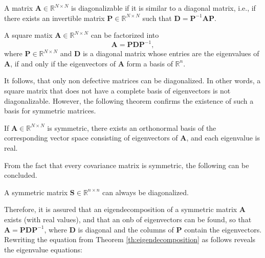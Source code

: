 \documentclass[../../../main.tex]{subfiles}
\begin{document}
\begin{theorem} \cite[p.98]{dei_2020}
A matrix $\bm{A} \in \mathbb{R}^{N \times N}$ is diagonalizable if it is similar to a diagonal matrix, i.e., if there exists an invertible matrix $\bm{P} \in \mathbb{R}^{N \times N}$ such that $\bm{D} = \bm{P}^{-1} \bm{A} \bm{P}$.
\end{theorem}

\begin{theorem}[Eigendecomposition]\label{th:eigendecomposition} \cite[p.99]{dei_2020}
A square matix $\bm{A} \in \mathbb{R}^{N \times N}$ can be factorized into
\begin{equation*}
    \bm{A} = \bm{P}\bm{D}\bm{P}^{-1},
\end{equation*}
where $\bm{P} \in \mathbb{R}^{N \times N}$ and $\bm{D}$ is a diagonal matrix whose entries are the eigenvalues of $\bm{A}$, if and only if the eigenvectors of $\bm{A}$ form a basis of $\mathbb{R}^n$.
\end{theorem}

It follows, that only non defective matrices can be diagonalized. In other words, a square matrix that does not have a complete basis of eigenvectors is not diagonalizable. However, the following theorem confirms the existence of such a basis for symmetric matrices.

\begin{theorem} \cite[p.94]{dei_2020}
If $\bm{A} \in \mathbb{R}^{N \times N}$ is symmetric, there exists an orthonormal basis of the corresponding vector space consisting of eigenvectors of $\bm{A}$, and each eigenvalue is real.
\end{theorem}

From the fact that every covariance matrix is symmetric, the following can be concluded.

\begin{theorem}
A symmetric matrix $\bm{S} \in \mathbb{R}^{n \times n}$ can always be diagonalized.
\end{theorem}

Therefore, it is assured that an eigendecomposition of a symmetric matrix $\bm{A}$ exists (with real values), and that an \acrshort{onb} of eigenvectors can be found, so that $\bm{A} = \bm{P}\bm{D}\bm{P}^{-1}$, where $\bm{D}$ is diagonal and the columns of $\bm{P}$ contain the eigenvectors. Rewriting the equation from Theorem \ref{th:eigendecomposition} as follows reveals the eigenvalue equations:
\end{document}
